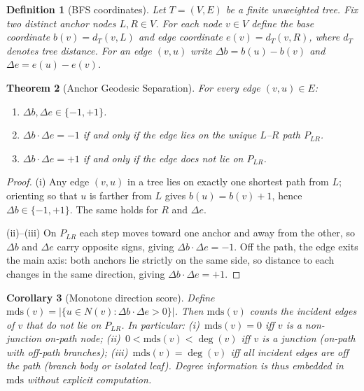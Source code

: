 \documentclass[11pt]{article}
\newtheorem{definition}{Definition}[section]
\newtheorem{theorem}[definition]{Theorem}
\newtheorem{corollary}[definition]{Corollary}
\begin{document}
\begin{definition}[BFS coordinates]
Let $T = (V, E)$ be a finite unweighted tree.  Fix two distinct \emph{anchor}
nodes $L, R \in V$.  For each node $v \in V$ define the \emph{base coordinate}
$b(v) = d_T(v, L)$ and \emph{edge coordinate} $e(v) = d_T(v, R)$, where $d_T$
denotes tree distance.  For an edge $(v, u)$ write $\Delta b = b(u) - b(v)$
and $\Delta e = e(u) - e(v)$.
\end{definition}

\begin{theorem}[Anchor Geodesic Separation]\label{thm:ags}
For every edge $(v, u) \in E$:
\begin{enumerate}[label=(\roman*)]
  \item $\Delta b, \Delta e \in \{-1, +1\}$.
  \item $\Delta b \cdot \Delta e = -1$ if and only if the edge lies on the unique $L$--$R$ path $P_{LR}$.
  \item $\Delta b \cdot \Delta e = +1$ if and only if the edge does not lie on $P_{LR}$.
\end{enumerate}
\end{theorem}

\begin{proof}
(i) Any edge $(v, u)$ in a tree lies on exactly one shortest path from $L$;
orienting so that $u$ is farther from $L$ gives $b(u) = b(v) + 1$, hence
$\Delta b \in \{-1, +1\}$.  The same holds for $R$ and $\Delta e$.

(ii)--(iii) On $P_{LR}$ each step moves toward one anchor and away from the other,
so $\Delta b$ and $\Delta e$ carry opposite signs, giving $\Delta b \cdot \Delta e = -1$.
Off the path, the edge exits the main axis: both anchors lie strictly on the
same side, so distance to each changes in the same direction,
giving $\Delta b \cdot \Delta e = +1$.
\end{proof}

\begin{corollary}[Monotone direction score]\label{cor:mds}
Define $\mathrm{mds}(v) = |\{u \in N(v) : \Delta b \cdot \Delta e > 0\}|$.
Then $\mathrm{mds}(v)$ counts the incident edges of $v$ that do not lie on $P_{LR}$.
In particular: (i)~$\mathrm{mds}(v) = 0$ iff $v$ is a non-junction on-path node;
(ii)~$0 < \mathrm{mds}(v) < \deg(v)$ iff $v$ is a junction (on-path with off-path branches);
(iii)~$\mathrm{mds}(v) = \deg(v)$ iff all incident edges are off the path (branch body or isolated leaf).
Degree information is thus embedded in $\mathrm{mds}$ without explicit computation.
\end{corollary}
\end{document}

